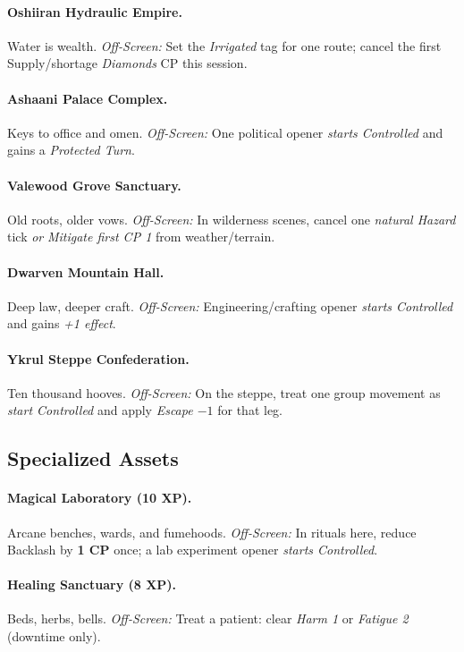 \documentclass[11pt]{article}
\begin{document}
\paragraph{Oshiiran Hydraulic Empire.} Water is wealth.
\emph{Off-Screen:} Set the \emph{Irrigated} tag for one route; cancel the first Supply/shortage \emph{Diamonds} CP this session.

\paragraph{Ashaani Palace Complex.} Keys to office and omen.
\emph{Off-Screen:} One political opener \emph{starts Controlled} and gains a \emph{Protected Turn}.

\paragraph{Valewood Grove Sanctuary.} Old roots, older vows.
\emph{Off-Screen:} In wilderness scenes, cancel one \emph{natural Hazard} tick \emph{or} \emph{Mitigate first CP 1} from weather/terrain.

\paragraph{Dwarven Mountain Hall.} Deep law, deeper craft.
\emph{Off-Screen:} Engineering/crafting opener \emph{starts Controlled} and gains \emph{+1 effect}.

\paragraph{Ykrul Steppe Confederation.} Ten thousand hooves.
\emph{Off-Screen:} On the steppe, treat one group movement as \emph{start Controlled} and apply \emph{Escape $-1$} for that leg.

\subsection*{Specialized Assets}
\paragraph{Magical Laboratory (10 XP).} Arcane benches, wards, and fumehoods.
\emph{Off-Screen:} In rituals here, reduce Backlash by \textbf{1 CP} once; a lab experiment opener \emph{starts Controlled}.

\paragraph{Healing Sanctuary (8 XP).} Beds, herbs, bells.
\emph{Off-Screen:} Treat a patient: clear \emph{Harm 1} or \emph{Fatigue 2} (downtime only).
\end{document}
